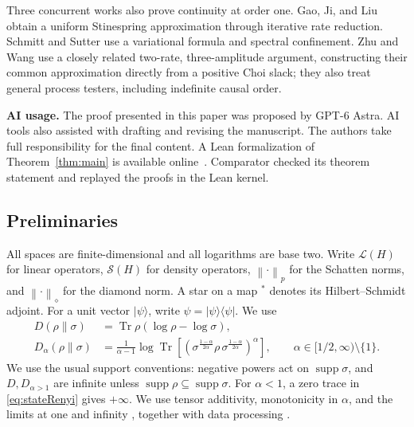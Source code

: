 \documentclass[11pt,letterpaper]{article}
\numberwithin{equation}{section}
\newcommand{\Tr}{\operatorname{Tr}}
\newcommand{\supp}{\operatorname{supp}}
\newcommand{\Dt}{D}
\newcommand{\cL}{\mathcal L}
\newcommand{\cS}{\mathcal S}
\newcommand{\norm}[1]{\left\lVert#1\right\rVert}
\begin{document}
Three concurrent works also prove continuity at order one. Gao, Ji, and Liu \cite{GaoJiLiu} obtain a uniform Stinespring approximation through iterative rate reduction. Schmitt and Sutter \cite{SchmittSutter} use a variational formula and spectral confinement. Zhu and Wang \cite{ZhuWang} use a closely related two-rate, three-amplitude argument, constructing their common approximation directly from a positive Choi slack; they also treat general process testers, including indefinite causal order.\par\medskip



\noindent\textbf{AI usage.} 
The proof presented in this paper was proposed by GPT-6 Astra. AI tools also assisted with drafting and revising the manuscript. The authors take full responsibility for the final content. A Lean formalization of Theorem~\ref{thm:main} is available online~\cite{WangLean}. Comparator checked its theorem statement and replayed the proofs in the Lean kernel.


\subsection{Preliminaries}\label{sec:prelim}
All spaces are finite-dimensional and all logarithms are base two. Write $\cL(H)$ for linear operators, $\cS(H)$ for density operators, $\norm{\cdot}_p$ for the Schatten norms, and $\norm{\cdot}_\diamond$ for the diamond norm. A star on a map ${}^*$ denotes its Hilbert--Schmidt adjoint. For a unit vector $|\psi\rangle$, write $\psi=|\psi\rangle\!\langle\psi|$. We use
\begin{align}
 D(\rho\|\sigma)&=\Tr\rho(\log\rho-\log\sigma),\label{eq:stateD}\\
 \Dt_\alpha(\rho\|\sigma)
 &=\frac1{\alpha-1}\log\Tr\!\left[
 \left(\sigma^{\frac{1-\alpha}{2\alpha}}\rho\,
              \sigma^{\frac{1-\alpha}{2\alpha}}\right)^\alpha\right],
 \qquad \alpha\in[1/2,\infty)\setminus\{1\}.
 \label{eq:stateRenyi}
\end{align}
We use the usual support conventions: negative powers act on $\supp\sigma$, and $D,\Dt_{\alpha>1}$ are infinite unless $\supp\rho\subseteq\supp\sigma$. For $\alpha<1$, a zero trace in \eqref{eq:stateRenyi} gives $+\infty$. We use tensor additivity, monotonicity in $\alpha$, and the limits at one and infinity \cite{MLDFT}, together with data processing \cite{FL,Beigi}.
\end{document}
